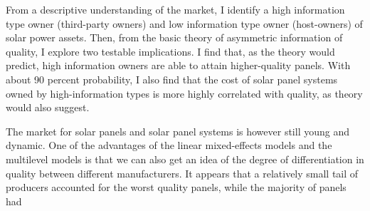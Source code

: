 \documentclass[12pt]{article}
\begin{document}
 From a descriptive understanding of the market, I identify a high information type owner (third-party owners) and low information type owner (host-owners) of solar power assets. Then, from the basic theory of asymmetric information of quality, I explore two testable implications. I find that, as the theory would predict, high information owners are able to attain higher-quality panels. With about 90 percent probability, I also find that the cost of solar panel systems owned by high-information types is more highly correlated with quality, as theory would also suggest.

 The market for solar panels and solar panel systems is however still young and dynamic. One of the advantages of the linear mixed-effects models and the multilevel models is that we can also get an idea of the degree of differentiation in quality between different manufacturers. It appears that a relatively small tail of producers accounted for the worst quality panels, while the majority of panels had 

\begin{spacing}{1}






\end{spacing}
\end{document}
